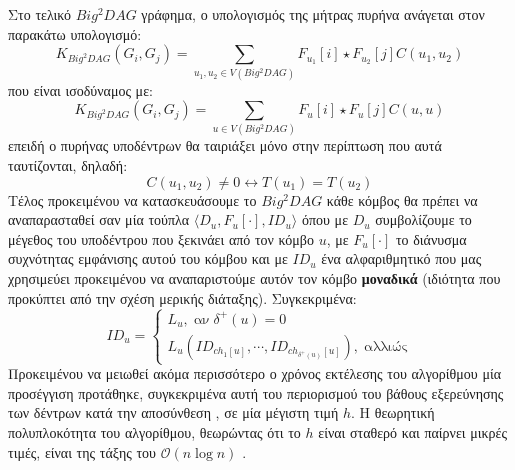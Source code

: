 Στο τελικό $Big^{2}DAG$ γράφημα, ο υπολογισμός της μήτρας πυρήνα ανάγεται στον παρακάτω υπολογισμό:
\begin{equation}
K_{Big^{2}DAG}(G_{i}, G_{j}) = \sum_{u_{1}, u_{2} \in V(Big^{2}DAG)} F_{u_{1}}[i] \star F_{u_{2}}[j] C(u_{1}, u_{2})
\end{equation}
που είναι ισοδύναμος με:
\begin{equation}
K_{Big^{2}DAG}(G_{i}, G_{j}) = \sum_{u \in V(Big^{2}DAG)} F_{u}[i] \star F_{u}[j] C(u, u)
\end{equation}
επειδή ο πυρήνας υποδέντρων θα ταιριάξει μόνο στην περίπτωση που αυτά ταυτίζονται, δηλαδή:
\begin{equation}
C(u_{1}, u_{2}) \not= 0 \leftrightarrow T(u_{1}) = T(u_{2})
\end{equation}
Τέλος προκειμένου να κατασκευάσουμε το $Big^{2}DAG$ κάθε κόμβος θα πρέπει να αναπαρασταθεί σαν μία τούπλα $\langle D_{u} , F_{u}[\cdot], ID_{u} \rangle$ όπου με $D_{u}$ συμβολίζουμε το μέγεθος του υποδέντρου που ξεκινάει από τον κόμβο $u$, με $F_{u}[\cdot]$ το διάνυσμα συχνότητας εμφάνισης αυτού του κόμβου και με $ID_{u}$ ένα αλφαριθμητικό που μας χρησιμεύει προκειμένου να αναπαριστούμε αυτόν τον κόμβο \textbf{μοναδικά} (ιδιότητα που προκύπτει από την σχέση μερικής διάταξης).
Συγκεκριμένα:
\begin{equation}
ID_{u} = \begin{cases}
            L_{u},\;\text{αν}\;\delta^{+}(u)=0\\
            L_{u}(ID_{ch_{1}[u]}, \cdots, ID_{ch_{\delta^{+}(u)}[u]}),\;\text{αλλιώς}
        \end{cases}
\end{equation}
Προκειμένου να μειωθεί ακόμα περισσότερο ο χρόνος εκτέλεσης του αλγορίθμου μία προσέγγιση προτάθηκε, συγκεκριμένα αυτή του περιορισμού του βάθους εξερεύνησης των δέντρων  κατά την αποσύνθεση , σε μία μέγιστη τιμή $h$.
Η θεωρητική πολυπλοκότητα του αλγορίθμου, θεωρώντας ότι το $h$ είναι σταθερό και παίρνει μικρές τιμές, είναι της τάξης του $\mathcal{O}(n\log n)$ \cite[]{Martino2012ATK}.

